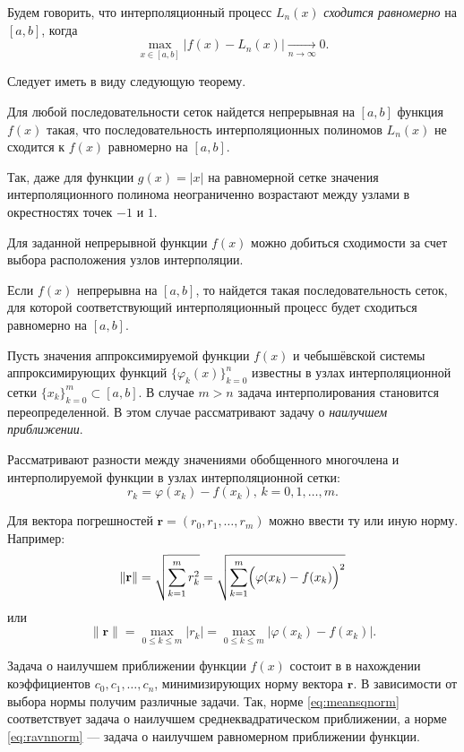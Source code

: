Будем говорить, что интерполяционный процесс $L_{n}(x)$ \emph{сходится
  равномерно} на $[a,b]$, когда
\[
\max_{x\in[a,b]}|f(x)-L_{n}(x)|\underset{n\rightarrow\infty}{\longrightarrow}0.
\]


Следует иметь в виду следующую теорему.
\begin{thm}
\emph{}Для любой последовательности сеток найдется непрерывная на
$[a,b]$ функция $f(x)$ такая, что последовательность интерполяционных
полиномов $L_{n}(x)$ не сходится к $f(x)$ равномерно на $[a,b]$.
\end{thm}
Так, даже для функции $g(x)=|x|$ на равномерной сетке значения интерполяционного
полинома неограниченно возрастают между узлами в окрестностях точек
$-1$ и $1$.

Для заданной непрерывной функции $f(x)$ можно добиться сходимости
за счет выбора расположения узлов интерполяции.
\begin{thm}
\emph{}Если $f(x)$ непрерывна на $[a,b]$, то найдется такая
последовательность сеток, для которой соответствующий интерполяционный
процесс будет сходиться равномерно на $[a,b]$.
\end{thm}


Пусть значения аппроксимируемой функции $f(x)$ и чебышёвской системы
аппроксимирующих функций $\{\varphi_{k}(x)\}_{k=0}^{n}$ известны в
узлах интерполяционной сетки $\{x_{k}\}_{k=0}^{m}\subset[a,b]$.  В
случае $m>n$ задача интерполирования становится переопределенной.  В
этом случае рассматривают задачу о \emph{наилучшем
  приближении}.

Рассматривают разности между значениями обобщенного многочлена и
интерполируемой функции в узлах интерполяционной сетки:
\[
r_{k}=\varphi(x_{k})-f(x_{k}),\, k=0,1,\dots,m.
\]

Для вектора погрешностей
$\mathbf{r}=\left(r_{0},r_{1},\dots,r_{m}\right)$ можно ввести ту или
иную норму. Например:
\begin{equation}
\|\mathbf{r}\|=\sqrt{\sum_{k=1}^{m}r_{k}^{2}}=\sqrt{\sum_{k=1}^{m}\Bigl(\varphi(x_{k})-f(x_{k})\Bigr)^{2}}\label{eq:meansqnorm}
\end{equation}
или
\begin{equation}
\|\mathbf{r}\|=\max_{0\leqslant k\leqslant m}|r_{k}|=\max_{0\leqslant k\leqslant m}|\varphi(x_{k})-f(x_{k})|.\label{eq:ravnnorm}
\end{equation}


Задача о наилучшем приближении функции $f(x)$ состоит в в нахождении
коэффициентов $c_{0},c_{1},\dots,c_{n}$, минимизирующих норму вектора
$\mathbf{r}$. В зависимости от выбора нормы получим различные задачи.
Так, норме \eqref{eq:meansqnorm} соответствует задача о наилучшем
среднеквадратическом приближении, а норме \eqref{eq:ravnnorm} ---
задача о наилучшем равномерном приближении функции.

